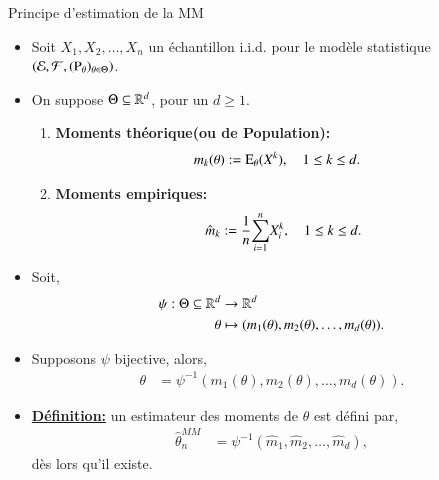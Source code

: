 \begin{frame}[allowframebreaks]{Principe d'estimation de la MM}
\begin{itemize}
    \item Soit $X_1, X_2, \ldots, X_n$ un échantillon i.i.d. pour le modèle statistique 
    $\left(\mathcal{E}, \mathcal{F}, (\operatorname{P}_\theta)_{\theta\in\Theta}\right)$. 
    \item On suppose $\Theta\subseteq \mathbb{R}^d$, pour un $d\geq 1$.
    \begin{enumerate}[-]
        \item \textbf{Moments théorique(ou de Population):} 
        \begin{align*}
            m_k(\theta) &:=\operatorname{E}_\theta(X^k), \quad 1\leq k\leq d.
        \end{align*}
        \item \textbf{Moments empiriques:}
        \begin{align*}
            \hat{m}_k :=\frac{1}{n}{\sum_{i=1}^n} X_i^k, \quad 1\leq k\leq d.
        \end{align*}
    \end{enumerate}
    \framebreak
    \item Soit,\begin{align*}
        \psi : \Theta \subseteq\mathbb{R}^d &\rightarrow \mathbb{R}^d\\
        \theta&\mapsto (m_1(\theta), m_2(\theta), \ldots, m_d(\theta)).
    \end{align*}
    \item Supposons $\psi$ bijective, alors,\begin{align*}
        \theta &= \psi^{-1}(m_1(\theta), m_2(\theta), \ldots, m_d(\theta)).
    \end{align*}
    \item \textbf{\underline{Définition:}} un estimateur des moments de $\theta$ est défini par, \begin{align*}
        \hat{\theta}^{MM}_n &=\psi^{-1}(\hat{m}_1, \hat{m}_2, \ldots, \hat{m}_d),
    \end{align*}
    dès lors qu'il existe.
\end{itemize}
\end{frame}
